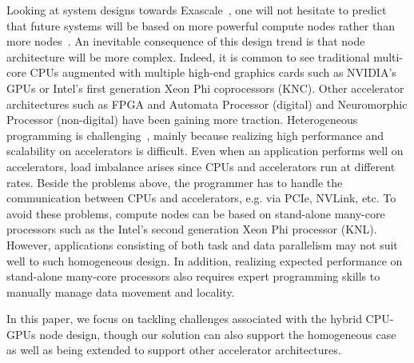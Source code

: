 Looking at system designs towards Exascale~\cite{top500}, one will not hesitate to predict that future systems will be based on more powerful compute nodes rather than more nodes~\cite{Shalf:exascaleChallenges}.  
An inevitable consequence of this design trend is that node architecture will be more complex.
Indeed, it is common to see traditional multi-core CPUs augmented with multiple high-end graphics cards such as NVIDIA's GPUs or Intel's first generation Xeon Phi coprocessors (KNC).
Other accelerator architectures such as FPGA and Automata Processor (digital) and Neuromorphic Processor (non-digital) have been gaining more traction.
Heterogeneous programming is challenging~\cite{exascaleRoadMap}, mainly because realizing high performance and scalability on accelerators is difficult.
Even when an application performs well on accelerators, load imbalance arises since CPUs and accelerators run at different rates.
Beside the problems above, the programmer has to handle the communication between CPUs and accelerators, e.g. via PCIe, NVLink, etc.
To avoid these problems, compute nodes can be based on stand-alone many-core processors such as the Intel's second generation Xeon Phi processor (KNL).
However, applications consisting of both task and data parallelism may not suit well to such homogeneous design.
In addition, realizing expected performance on stand-alone many-core processors also requires expert programming skills
to manually manage data movement and locality.





In this paper, we focus on tackling challenges associated with the hybrid CPU-GPUs node design, though our solution can also support the homogeneous case as well as being extended to support other accelerator architectures.
